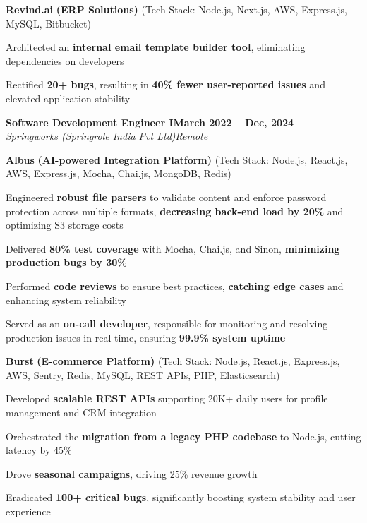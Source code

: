 \documentclass[letterpaper, 10pt]{article}
\newcommand{\heading}[2]{ \hspace{5pt}#1\hfill#2\\[1pt] }
\newcommand{\headingBf}[2]{ \heading{\textbf{#1}}{\textbf{#2}} }
\newcommand{\headingIt}[2]{ \heading{\textit{#1}}{\textit{#2}} }
\newenvironment{resume_list}{
\vspace{-3pt}
\begin{itemize}[itemsep=0.5pt, parsep=0.5pt, leftmargin=18pt] }{ \end{itemize}
\vspace{-3pt}
}
\begin{document}
\vspace{5pt}

\hspace{10pt}\textbf{Revind.ai} \textbf{(ERP Solutions)} \small{(Tech Stack: Node.js, Next.js, AWS, Express.js, MySQL, Bitbucket)}
\begin{resume_list}
    \item Architected an \textbf{internal email template builder tool}, eliminating dependencies on developers
    \item Rectified \textbf{20+ bugs}, resulting in \textbf{40\% fewer user-reported issues} and elevated application stability
\end{resume_list}

\vspace{6pt}

\headingBf{Software Development Engineer I}{March 2022 -- Dec, 2024}
\headingIt{Springworks (Springrole India Pvt Ltd)}{Remote}

\vspace{5pt}

\hspace{10pt}\textbf{Albus} \textbf{(AI-powered Integration Platform)} \small{(Tech Stack: Node.js, React.js, AWS, Express.js, Mocha, Chai.js, MongoDB, Redis)}
\begin{resume_list}
    \item Engineered \textbf{robust file parsers} to validate content and enforce password protection across multiple formats, \textbf{decreasing back-end load by 20\%} and optimizing S3 storage costs 
    \item Delivered \textbf{80\% test coverage} with Mocha, Chai.js, and Sinon, \textbf{minimizing production bugs by 30\%}
    \item Performed \textbf{code reviews} to ensure best practices, \textbf{catching edge cases} and enhancing system reliability
    \item Served as an \textbf{on-call developer}, responsible for monitoring and resolving production issues in real-time, ensuring \textbf{99.9\% system uptime}
\end{resume_list}

\vspace{4pt}

\hspace{10pt}\textbf{Burst} \textbf{(E-commerce Platform)} \small{(Tech Stack: Node.js, React.js, Express.js, AWS, Sentry, Redis, MySQL, REST APIs, PHP, Elasticsearch)}
\begin{resume_list}
    \item Developed \textbf{scalable REST APIs} supporting 20K+ daily users for profile management and CRM integration
    \item Orchestrated the \textbf{migration from a legacy PHP codebase} to Node.js, cutting latency by 45\%
    \item Drove \textbf{seasonal campaigns}, driving 25\% revenue growth
    \item Eradicated \textbf{100+ critical bugs}, significantly boosting system stability and user experience
\end{resume_list}
\end{document}

